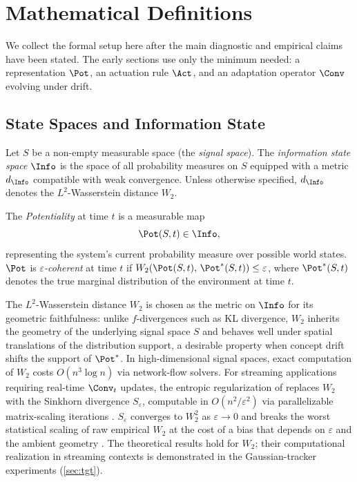 \section{Mathematical Definitions}\label{sec:definitions}

We collect the formal setup here after the main diagnostic and empirical claims
have been stated. The early sections use only the minimum needed: a
representation $\Pot$, an actuation rule $\Act$, and an adaptation operator
$\Conv$ evolving under drift.

\subsection{State Spaces and Information State}

\begin{definition}\label{def:statespace}
Let $S$ be a non-empty measurable space (the \emph{signal space}).
The \emph{information state space} $\Info$ is the space of all probability
measures on $S$ equipped with a metric $d_\Info$ compatible with weak
convergence.
Unless otherwise specified, $d_\Info$ denotes the $L^2$-Wasserstein
distance $W_2$.
\end{definition}

\begin{definition}[Potentiality]\label{def:potentiality}
The \emph{Potentiality} at time $t$ is a measurable map
\[
  \Pot(S,t) \in \Info,
\]
representing the system's current probability measure over possible world
states.
$\Pot$ is \emph{$\varepsilon$-coherent} at time $t$ if
$W_2\!\left(\Pot(S,t),\,\Pot^*(S,t)\right)\leq\varepsilon$,
where $\Pot^*(S,t)$ denotes the true marginal distribution of the
environment at time $t$.
\end{definition}

\begin{remark}\label{rem:sinkhorn}
The $L^2$-Wasserstein distance $W_2$ is chosen as the metric on $\Info$
for its geometric faithfulness: unlike $f$-divergences such as KL
divergence, $W_2$ inherits the geometry of the underlying signal space $S$
and behaves well under spatial translations of the distribution support,
a desirable property when concept drift shifts the support of $\Pot^*$.
In high-dimensional signal spaces, exact computation of $W_2$ costs
$O(n^3\log n)$ via network-flow solvers.
For streaming applications requiring real-time $\Conv_t$ updates, the
entropic regularization of \citet{Cuturi2013} replaces $W_2$ with the
Sinkhorn divergence $S_\varepsilon$, computable in $O(n^2/\varepsilon^2)$
via parallelizable matrix-scaling iterations \citep{Altschuler2017}.
$S_\varepsilon$ converges to $W_2^2$ as $\varepsilon\to 0$ and breaks
the worst statistical scaling of raw empirical $W_2$ at the cost of a bias that
depends on $\varepsilon$ and the ambient geometry
\citep{GenevayEtAl2019}.
The theoretical results hold for $W_2$; their computational realization
in streaming contexts is demonstrated in the Gaussian-tracker experiments
(\cref{sec:tgt}).
\end{remark}

